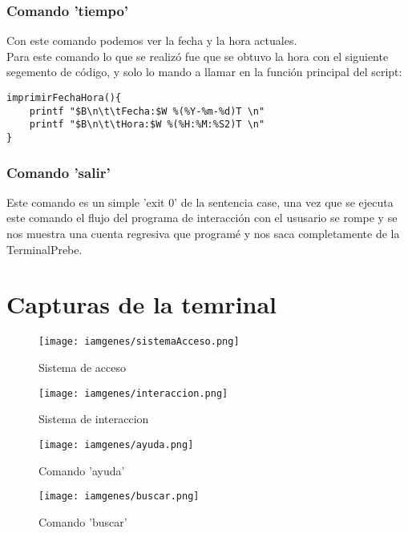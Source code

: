 \documentclass[titlepage]{article}
\begin{document}
\subsubsection{Comando 'tiempo'}
Con este comando podemos ver la fecha y la hora actuales.\\
Para este comando lo que se realizó fue que se obtuvo la hora con el siguiente segemento de código, y solo lo mando a llamar en la función principal del script:
\begin{verbatim}
imprimirFechaHora(){
    printf "$B\n\t\tFecha:$W %(%Y-%m-%d)T \n"
    printf "$B\n\t\tHora:$W %(%H:%M:%S2)T \n"
}
\end{verbatim}

\subsubsection{Comando 'salir'}
Este comando es un simple 'exit 0' de la sentencia case, una vez que se ejecuta este comando el flujo del programa de interacción con el ususario se rompe y se nos muestra una cuenta regresiva que programé y nos saca completamente de la TerminalPrebe.



\section{Capturas de la temrinal}

\begin{figure}[h]
    \centering
    \texttt{[image: iamgenes/sistemaAcceso.png]}
    \caption{Sistema de acceso}
    \label{fig:sistemaacceso}
\end{figure}

 \begin{figure}[h]
    \centering
    \texttt{[image: iamgenes/interaccion.png]}
    \caption{Sistema de interaccion}
    \label{fig:interaccion}
\end{figure}

\begin{figure}[h]
    \centering
    \texttt{[image: iamgenes/ayuda.png]}
    \caption{Comando 'ayuda'}
    \label{fig:ayuda}
\end{figure}

\begin{figure}[h]
    \centering
    \texttt{[image: iamgenes/buscar.png]}
    \caption{Comando 'buscar'}
    \label{"fig:buscar"}
\end{figure}
\end{document}
